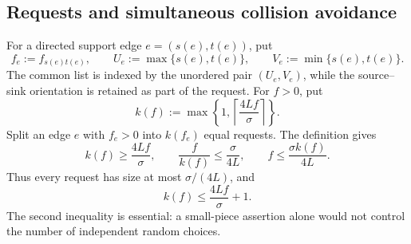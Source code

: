 \documentclass[11pt]{article}
\numberwithin{equation}{section}
\theoremstyle{definition}
\theoremstyle{remark}
\newcommand{\1}{\mathbf 1}
\begin{document}
\subsection{Requests and simultaneous collision avoidance}
\label{subsec:tangent-LLL}

For a directed support edge \(e=(s(e),t(e))\), put
\[
 f_e:=f_{s(e)t(e)},\qquad
 U_e:=\max\{s(e),t(e)\},\qquad V_e:=\min\{s(e),t(e)\}.
\]
The common list is indexed by the unordered pair
\((U_e,V_e)\), while the source--sink orientation is retained as part of
the request.  For \(f>0\), put
\begin{equation}
 k(f):=\max\left\{1,\left\lceil\frac{4Lf}{\sigma}\right\rceil\right\}.
\label{eq:tangent-request-splitting}
\end{equation}
Split an edge \(e\) with \(f_e>0\) into \(k(f_e)\) equal requests.  The
definition gives
\[
                  k(f)\geq\frac{4Lf}{\sigma},
 \qquad \frac{f}{k(f)}\leq\frac{\sigma}{4L},
 \qquad f\leq\frac{\sigma k(f)}{4L}.
\]
Thus every request has size at most \(\sigma/(4L)\), and
\begin{equation}
                         k(f)\leq\frac{4Lf}{\sigma}+1.
\label{eq:tangent-request-count-edge}
\end{equation}
The second inequality is essential: a small-piece assertion alone would
not control the number of independent random choices.
\end{document}
